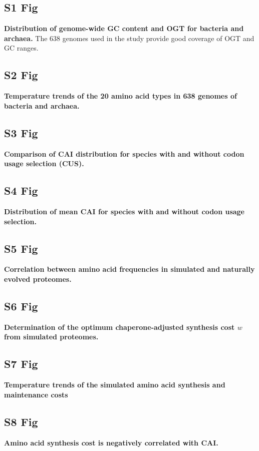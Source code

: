 \documentclass[10pt,letterpaper]{article}
\begin{document}
\subsection*{S1 Fig}
\label{fig:s1}
{\bf Distribution of genome-wide GC content and OGT for bacteria and archaea.}
The 638 genomes used in the study provide good coverage of OGT and GC ranges.


\subsection*{S2 Fig}
\label{fig:s2}
{\bf Temperature trends of the 20 amino acid types in 638 genomes of bacteria and archaea. }

\subsection*{S3 Fig}
\label{fig:s3}
{\bf Comparison of CAI distribution for species with and without codon usage selection (CUS).}

\subsection*{S4 Fig}
\label{fig:s4}
{\bf Distribution of mean CAI for species with and without codon usage selection.}

\subsection*{S5 Fig}
\label{fig:s5}
{\bf Correlation between amino acid frequencies in simulated and naturally evolved proteomes.}

\subsection*{S6 Fig}
\label{fig:s6}
{\bf Determination of the optimum chaperone-adjusted synthesis cost $w$ from simulated proteomes.}

\subsection*{S7 Fig}
\label{fig:s7}
{\bf Temperature trends of the simulated amino acid synthesis and maintenance costs}

\subsection*{S8 Fig}
\label{fig:s8}
{\bf Amino acid synthesis cost is negatively correlated with CAI.}
\end{document}
